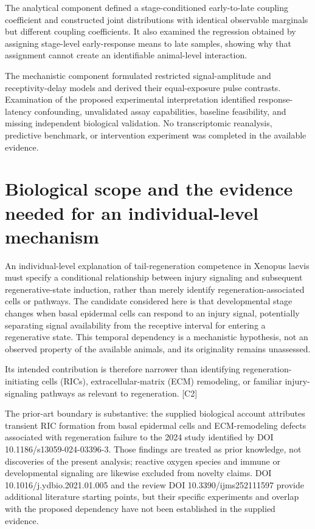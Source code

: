 \documentclass[11pt]{article}
\begin{document}
The analytical component defined a stage-conditioned early-to-late coupling coefficient and constructed joint distributions with identical observable marginals but different coupling coefficients. It also examined the regression obtained by assigning stage-level early-response means to late samples, showing why that assignment cannot create an identifiable animal-level interaction.

The mechanistic component formulated restricted signal-amplitude and receptivity-delay models and derived their equal-exposure pulse contrasts. Examination of the proposed experimental interpretation identified response-latency confounding, unvalidated assay capabilities, baseline feasibility, and missing independent biological validation. No transcriptomic reanalysis, predictive benchmark, or intervention experiment was completed in the available evidence.

\section{Biological scope and the evidence needed for an individual-level mechanism}
An individual-level explanation of tail-regeneration competence in Xenopus laevis must specify a conditional relationship between injury signaling and subsequent regenerative-state induction, rather than merely identify regeneration-associated cells or pathways. The candidate considered here is that developmental stage changes when basal epidermal cells can respond to an injury signal, potentially separating signal availability from the receptive interval for entering a regenerative state. This temporal dependency is a mechanistic hypothesis, not an observed property of the available animals, and its originality remains unassessed.

Its intended contribution is therefore narrower than identifying regeneration-initiating cells (RICs), extracellular-matrix (ECM) remodeling, or familiar injury-signaling pathways as relevant to regeneration. [C2]

The prior-art boundary is substantive: the supplied biological account attributes transient RIC formation from basal epidermal cells and ECM-remodeling defects associated with regeneration failure to the 2024 study identified by DOI 10.1186/s13059-024-03396-3. Those findings are treated as prior knowledge, not discoveries of the present analysis; reactive oxygen species and immune or developmental signaling are likewise excluded from novelty claims. DOI 10.1016/j.ydbio.2021.01.005 and the review DOI 10.3390/ijms252111597 provide additional literature starting points, but their specific experiments and overlap with the proposed dependency have not been established in the supplied evidence.
\end{document}
